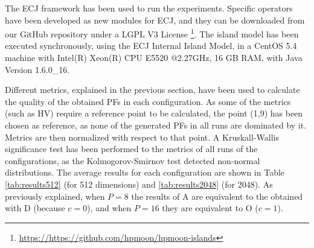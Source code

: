 \documentclass[Afour,sageh,times]{sagej}
\begin{document}
The ECJ framework \citep{ECJ} has been used to run the
experiments. Specific operators have been developed as new modules for
ECJ, and they can be downloaded from our GitHub repository under a
LGPL V3 License
\footnote{\url{https://https://github.com/hpmoon/hpmoon-islands}}. The
island model has been executed synchronously, using the ECJ Internal
Island Model, in a CentOS 5.4 machine with Intel(R) Xeon(R) CPU E5520
@2.27GHz, 16 GB RAM, with Java Version 1.6.0\_16.


Different metrics, explained in the previous section, have been used to calculate the quality of the obtained PFs in each configuration. As some of the metrics  (such as HV) require a reference point to be calculated, the point (1,9) has been chosen as reference, as none of the generated PFs in all runs are dominated by it. Metrics are then normalized with respect to that point. A Kruskall-Wallis significance test has been performed to the metrics of all runs of the configurations, as the Kolmogorov-Smirnov test detected non-normal distributions. The average results for each configuration are shown in Table \ref{tab:results512} (for 512 dimensions) and \ref{tab:results2048} (for 2048). As previously explained, when $P=8$ the results of A are equivalent to the obtained with D (because $c=0$), and when $P=16$ they are equivalent to O ($c=1$).
\end{document}
